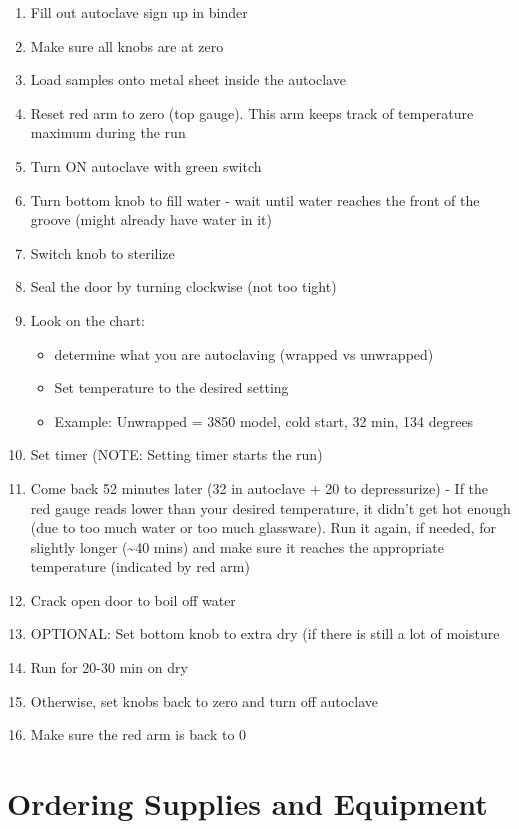 \documentclass[
  letterpaper,
  DIV=11,
  numbers=noendperiod]{scrreprt}
\begin{document}
\begin{enumerate}
\def\labelenumi{\arabic{enumi}.}
\item
  Fill out autoclave sign up in binder
\item
  Make sure all knobs are at zero
\item
  Load samples onto metal sheet inside the autoclave
\item
  Reset red arm to zero (top gauge). This arm keeps track of temperature
  maximum during the run
\item
  Turn ON autoclave with green switch
\item
  Turn bottom knob to fill water - wait until water reaches the front of
  the groove (might already have water in it)
\item
  Switch knob to sterilize
\item
  Seal the door by turning clockwise (not too tight)
\item
  Look on the chart:

  \begin{itemize}
  \item
    determine what you are autoclaving (wrapped vs unwrapped)
  \item
    Set temperature to the desired setting
  \item
    Example: Unwrapped = 3850 model, cold start, 32 min, 134 degrees
  \end{itemize}
\item
  Set timer (NOTE: Setting timer starts the run)
\item
  Come back 52 minutes later (32 in autoclave + 20 to depressurize) - If
  the red gauge reads lower than your desired temperature, it didn't get
  hot enough (due to too much water or too much glassware). Run it
  again, if needed, for slightly longer (\textasciitilde40 mins) and
  make sure it reaches the appropriate temperature (indicated by red
  arm)
\item
  Crack open door to boil off water
\item
  OPTIONAL: Set bottom knob to extra dry (if there is still a lot of
  moisture
\item
  Run for 20-30 min on dry
\item
  Otherwise, set knobs back to zero and turn off autoclave
\item
  Make sure the red arm is back to 0\\
\end{enumerate}

\hypertarget{ordering-supplies-and-equipment}{%
\chapter{Ordering Supplies and
Equipment}\label{ordering-supplies-and-equipment}}
\end{document}

